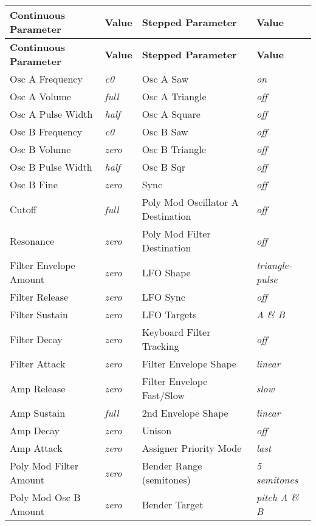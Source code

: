 \begin{longtable}[l]{p{5cm}|p{5cm}|p{5cm}|p{5cm}|} 
\textbf{Continuous Parameter} & \textbf{Value} & \textbf{Stepped Parameter} & \textbf{Value} \\ \hline
\endfirsthead
\textbf{Continuous Parameter} & \textbf{Value} & \textbf{Stepped Parameter} & \textbf{Value} \\ \hline
\endhead 
Osc A Frequency & \textit{c0} & Osc A Saw & \textit{on} \\ \hline
Osc A Volume & \textit{full} & Osc A Triangle &\textit{off} \\ \hline
Osc A Pulse Width & \textit{half} & Osc A Square & \textit{off} \\ \hline
Osc B Frequency & \textit{c0} & Osc B Saw & \textit{off} \\ \hline
Osc B Volume & \textit{zero} & Osc B Triangle & \textit{off} \\ \hline
Osc B Pulse Width & \textit{half} & Osc B Sqr &\textit{off} \\ \hline
Osc B Fine & \textit{zero} & Sync & \textit{off} \\ \hline
Cutoff & \textit{full} & Poly Mod Oscillator A Destination & \textit{off} \\ \hline
Resonance & \textit{zero} & Poly Mod Filter Destination & \textit{off} \\ \hline
Filter Envelope Amount & \textit{zero} & LFO Shape & \textit{triangle-pulse} \\ \hline
Filter Release & \textit{zero} & LFO Sync & \textit{off} \\ \hline
Filter Sustain & \textit{zero} & LFO Targets & \textit{A \& B} \\ \hline
Filter Decay & \textit{zero} & Keyboard Filter Tracking & \textit{off} \\ \hline
Filter Attack & \textit{zero} & Filter Envelope Shape & \textit{linear} \\ \hline
Amp Release & \textit{zero} & Filter Envelope Fast/Slow & \textit{slow} \\ \hline
Amp Sustain & \textit{full} & 2nd Envelope Shape & \textit{linear} \\ \hline
Amp Decay & \textit{zero} & Unison & \textit{off} \\ \hline
Amp Attack & \textit{zero} & Assigner Priority Mode & \textit{last} \\ \hline
Poly Mod Filter Amount & \textit{zero} & Bender Range (semitones) & \textit{5 semitones} \\ \hline
Poly Mod Osc B Amount & \textit{zero} & Bender Target & \textit{pitch A \& B} \\ \hline

\end{longtable}
